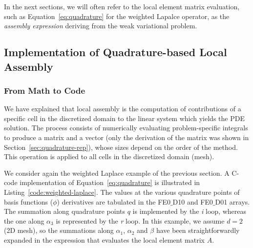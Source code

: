 In the next sections, we will often refer to the local element matrix evaluation, such as Equation~\ref{eq:quadrature} for the weighted Lapalce operator, as the \textit{assembly expression} deriving from the weak variational problem.

\subsection{Implementation of Quadrature-based Local Assembly}
\subsubsection{From Math to Code}
We have explained that local assembly is the computation of contributions of a specific cell in the discretized domain to the linear system which yields the PDE solution. The process consists of numerically evaluating problem-specific integrals to produce a matrix and a vector (only the derivation of the matrix was shown in Section~\ref{sec:quadrature-rep}), whose sizes depend on the order of the method. This operation is applied to all cells in the discretized domain (mesh).

We consider again the weighted Laplace example of the previous section. A C-code implementation of Equation~\ref{eq:quadrature} is illustrated in Listing~\ref{code:weighted-laplace}. The values at the various quadrature points of basis functions ($\phi$) derivatives are tabulated in the FE0$\_$D10 and FE0$\_$D01 arrays. The summation along quadrature points $q$ is implemented by the \emph{i} loop, whereas the one along $\alpha_3$ is represented by the \emph{r} loop. In this example, we assume $d=2$ (2D mesh), so the summations along $\alpha_1$, $\alpha_2$ and $\beta$ have been straightforwardly expanded in the expression that evaluates the local element matrix $A$. 

